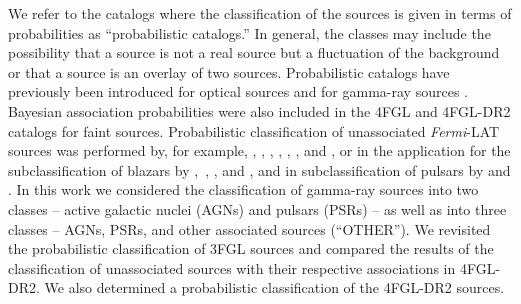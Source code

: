 \documentclass[referee]{aa} %
\newcommand{\Fermi}{\textit{Fermi}\xspace}
\begin{document}
We refer to the catalogs where the classification of the sources is given in terms of probabilities as ``probabilistic catalogs.''
In general, the classes may include the possibility that a source is not a real source but a fluctuation of the background 
\citep{2021A&A...656A..62P}
or that a source is an overlay of two sources.
Probabilistic catalogs
have previously been introduced for optical sources 
\citep[e.g.,][]{2010EAS....45..351H, 2013AJ....146....7B}
and for gamma-ray sources \citep{2017ApJ...839....4D}.
Bayesian association probabilities were also included in the 4FGL \citep{2020ApJS..247...33A} and
4FGL-DR2 \citep{2020arXiv200511208B} catalogs for faint sources.
Probabilistic classification of unassociated \Fermi-LAT sources was performed by, for example,
\cite{2012ApJ...753...83A}, \cite{2016ApJ...820....8S}, \cite{2016ApJ...825...69M}, \cite{2017A&A...602A..86L}, \cite{2020MNRAS.492.5377L}, 
\cite{2021MNRAS.507.4061F}, and \cite{2021RAA....21...15Z},
or in the application for the subclassification of blazars by
\hbox{\cite{2013MNRAS.428..220H}, \cite{2014ApJ...782...41D},}
\cite{2016MNRAS.462.3180C, 2017MNRAS.470.1291S, 2019MNRAS.490.4770K}, and \cite{2020MNRAS.493.1926K},
and in subclassification of pulsars by \cite{2012MNRAS.424.2832L} and \cite{2016ApJ...820....8S}.
In this work we considered the classification of gamma-ray sources into two classes -- active galactic nuclei (AGNs) and pulsars (PSRs) -- as well as into three classes 
-- AGNs, PSRs, and other associated sources (``OTHER'').
We revisited the probabilistic classification of 3FGL sources and compared the results of the classification of unassociated sources
with their respective associations in 4FGL-DR2.
We also determined a probabilistic classification of the 4FGL-DR2 sources.
\end{document}
